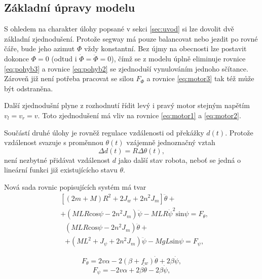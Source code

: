 \documentclass[conference]{IEEEtran}
\begin{document}
\subsection{Základní úpravy modelu}
S ohledem na charakter úlohy popsané v sekci \ref{sec:uvod} si lze dovolit dvě základní zjednodušení. Protože segway
má pouze balancovat nebo jezdit po rovné čáře, bude jeho azimut $\varPhi$ vždy konstantní. 
Bez újmy na obecnosti lze postavit dokonce $\varPhi = 0$ (odtud i $\dot{\varPhi} = \ddot{\varPhi} = 0$),
čímž se z modelu úplně eliminuje rovnice \eqref{eq:pohyb3}
a rovnice \eqref{eq:pohyb2} se zjednoduší vynulováním jednoho sčítance. Zároveň již není potřeba pracovat se silou $F_\varPhi$
a rovnice \eqref{eq:motor3} tak též může být odstraněna.

Další zjednodušní plyne z rozhodnutí řídit levý i pravý motor stejným napětím $v_l = v_r = v$.
Toto zjednodušení má vliv na rovnice \eqref{eq:motor1} a \eqref{eq:motor2}.

Součástí druhé úlohy je rovněž regulace vzdálenosti od překážky $d(t)$.
Protože vzdálenost svazuje s proměnnou $\theta(t)$ vzájemně jednoznačný vztah
\begin{equation}
    \Delta d(t) = R \Delta\theta(t),
    \label{eq:vzdalenost}
\end{equation}
není nezbytné přidávat vzdálenost $d$ jako další stav robota, neboť se jedná o lineární funkci již existujícícho stavu $\theta$.

Nová sada rovnic popisujících systém má tvar
\begin{equation}
    \begin{aligned}
        &\left[(2m + M) R^2 + 2 J_w + 2n^2 J_m\right] \ddot{\theta} + \\
        &+ (MLR \text{cos} \psi - 2n^2 J_m) \ddot{\psi} - MLR\dot{\psi}^2 \text{sin} \psi = F_\theta,
    \end{aligned}
    \label{eq:pohyb1_easy}
\end{equation}
\begin{equation}
    \begin{aligned}
        & (MLR \text{cos} \psi - 2n^2 J_m) \ddot{\theta} + \\
        & + (ML^2 + J_\psi + 2n^2 J_m) \ddot{\psi} - MgL\text{sin}\psi = F_\psi,
    \end{aligned}
    \label{eq:pohyb2_easy}
\end{equation}

\begin{equation}
    F_\theta = 2v \alpha - 2(\beta + f_w) \dot{\theta} + 2\beta\dot{\psi},
    \label{eq:motor1_easy}
\end{equation}
\begin{equation}
    F_\psi = - 2v \alpha + 2\beta \dot{\theta} - 2\beta \dot{\psi},
    \label{eq:motor2_easy}
\end{equation}
\end{document}
